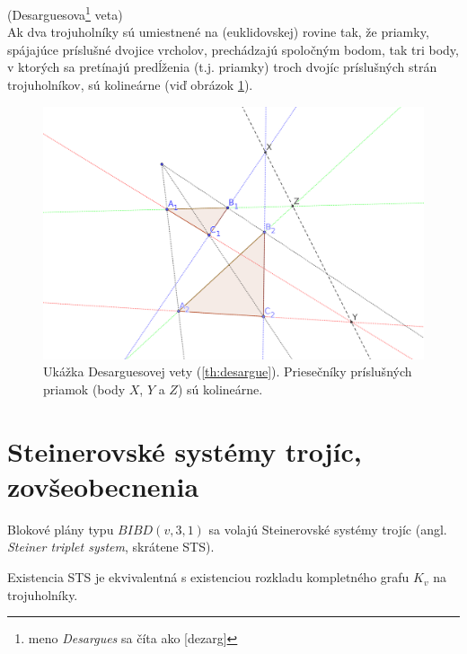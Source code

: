 \begin{theorem_hard}{(Desarguesova\footnote{meno \emph{Desargues} sa číta ako [dezarg]} veta)}\\
\label{th:desargue}
Ak dva trojuholníky sú umiestnené na (euklidovskej) rovine tak, že priamky, spájajúce príslušné dvojice vrcholov, prechádzajú spoločným bodom, tak tri body, v ktorých sa pretínajú predĺženia (t.j. priamky) troch dvojíc príslušných strán trojuholníkov, sú kolineárne (viď obrázok \ref{img:desargue}).
\end{theorem_hard}
\begin{figure}
    \centering
    \includegraphics[width=\textwidth]{geogebra-export3.pdf}
    \caption{Ukážka Desarguesovej vety (\ref{th:desargue}). Priesečníky príslušných priamok (body $X$, $Y$ a $Z$) sú kolineárne.}
    \label{img:desargue}
\end{figure}


\section{Steinerovské systémy trojíc, zovšeobecnenia}

\begin{definition}
Blokové plány typu $BIBD(v, 3, 1)$ sa volajú Steinerovské systémy trojíc (angl. \emph{Steiner triplet system}, skrátene STS).
\end{definition}

\begin{remark}
Existencia STS je ekvivalentná s existenciou rozkladu kompletného grafu $K_v$ na trojuholníky.
\end{remark}

